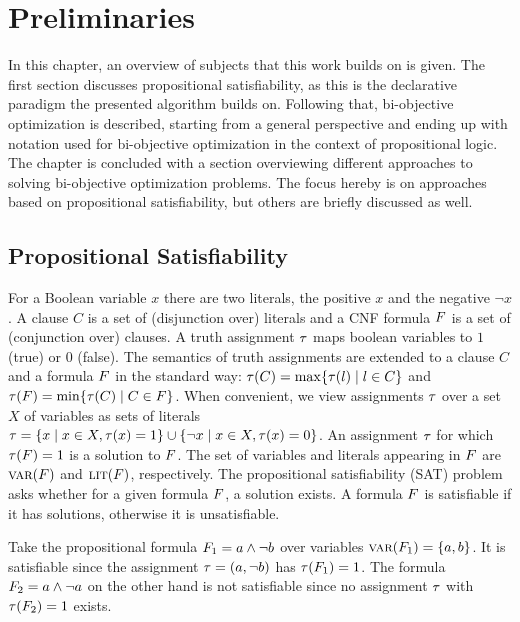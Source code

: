 \chapter{Preliminaries\label{chap:preliminaries}}

In this chapter, an overview of subjects that this work builds on is given.
The first section discusses propositional satisfiability, as this is the declarative paradigm the presented algorithm builds on.
Following that, bi-objective optimization is described, starting from a general perspective and ending up with notation used for bi-objective optimization in the context of propositional logic.
The chapter is concluded with a section overviewing different approaches to solving bi-objective optimization problems.
The focus hereby is on approaches based on propositional satisfiability, but others are briefly discussed as well.

\section{Propositional Satisfiability\label{sec:sat}}

For a Boolean variable $x$ there are two literals, the positive $x$ and the negative $\lnot x$. 
A clause $C$ is a set of (disjunction over) literals and a CNF formula $F$ is a set of (conjunction over) clauses.
A truth assignment $\tau$ maps boolean variables to $1$ (true) or $0$ (false).
The semantics of truth assignments are extended to a clause $C$ and a formula $F$ in the standard way: $\tau(C) = \max\{ \tau(l) \mid l \in C\}$ and $\tau(F) = \min\{\tau(C) \mid C \in F\}$.
When convenient, we view assignments $\tau$ over a set $X$ of variables as sets of literals $\tau = \{ x \mid x \in X,  \tau(x) = 1\} \cup \{ \lnot x \mid x \in X, \tau(x) = 0\}$.
An assignment $\tau$ for which $\tau(F) = 1$ is a solution to $F$.
The set of variables and literals appearing in $F$ are $\textsc{var}(F)$ and $\textsc{lit}(F)$, respectively.  
The propositional satisfiability (SAT) problem asks whether for a given formula $F$, a solution exists.
A formula $F$ is satisfiable if it has solutions, otherwise it is unsatisfiable.

\begin{example}
  Take the propositional formula $F_1 = a \land \lnot b$ over variables $\textsc{var}(F_1) = \{a,b\}$.
  It is satisfiable since the assignment $\tau=(a,\lnot b)$ has $\tau(F_1)=1$.
  The formula $F_2 = a \land \lnot a$ on the other hand is not satisfiable since no assignment $\tau$ with $\tau(F_2)=1$ exists.
\end{example}

